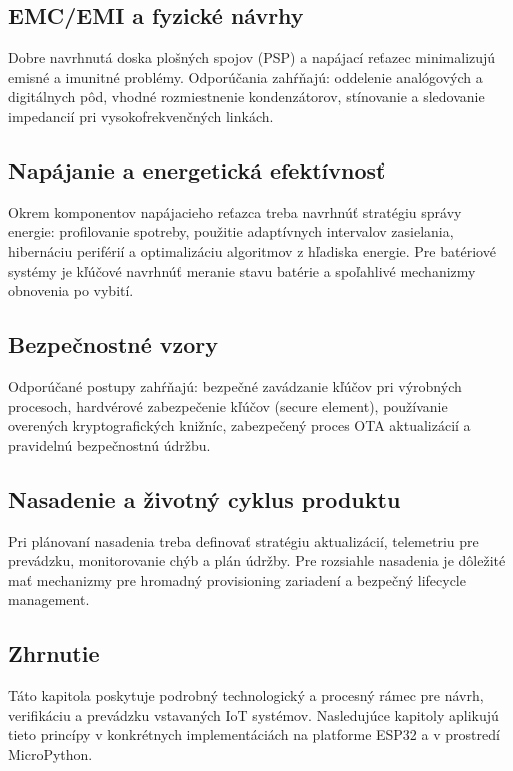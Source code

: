 \subsection{EMC/EMI a fyzické návrhy}
Dobre navrhnutá doska plošných spojov (PSP) a napájací reťazec minimalizujú emisné a imunitné problémy. Odporúčania zahŕňajú: oddelenie analógových a digitálnych pôd, vhodné rozmiestnenie kondenzátorov, stínovanie a sledovanie impedancií pri vysokofrekvenčných linkách.

\subsection{Napájanie a energetická efektívnosť}
Okrem komponentov napájacieho reťazca treba navrhnúť stratégiu správy energie: profilovanie spotreby, použitie adaptívnych intervalov zasielania, hibernáciu periférií a optimalizáciu algoritmov z hľadiska energie. Pre batériové systémy je kľúčové navrhnúť meranie stavu batérie a spoľahlivé mechanizmy obnovenia po vybití.

\subsection{Bezpečnostné vzory}
Odporúčané postupy zahŕňajú: bezpečné zavádzanie kľúčov pri výrobných procesoch, hardvérové zabezpečenie kľúčov (secure element), používanie overených kryptografických knižníc, zabezpečený proces OTA aktualizácií a pravidelnú bezpečnostnú údržbu.

\subsection{Nasadenie a životný cyklus produktu}
Pri plánovaní nasadenia treba definovať stratégiu aktualizácií, telemetriu pre prevádzku, monitorovanie chýb a plán údržby. Pre rozsiahle nasadenia je dôležité mať mechanizmy pre hromadný provisioning zariadení a bezpečný lifecycle management.

\subsection{Zhrnutie}
Táto kapitola poskytuje podrobný technologický a procesný rámec pre návrh, verifikáciu a prevádzku vstavaných IoT systémov. Nasledujúce kapitoly aplikujú tieto princípy v konkrétnych implementáciách na platforme ESP32 a v prostredí MicroPython.

